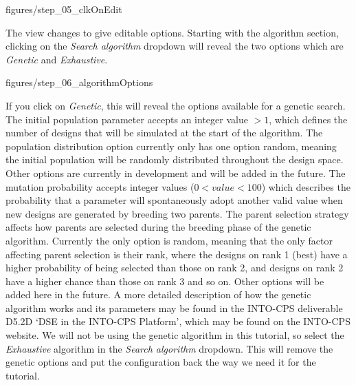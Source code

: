 \documentclass[11pt,a4paper]{../tutorial}
\begin{document}
\begin{instructions}
\begin{center}\begin{annotation}[width=0.7\linewidth,trim=0 0 0 0,clip]{figures/step_05_clkOnEdit}
\end{annotation}\end{center}

\newpage

The view changes to give editable options. Starting with the algorithm section, clicking on the \emph{Search algorithm} dropdown will reveal the two options which are \emph{Genetic} and \emph{Exhaustive}.



\begin{center}\begin{annotation}[width=0.7\linewidth,trim=0 0 0 0,clip]{figures/step_06_algorithmOptions}
    \end{annotation}\end{center}

\newpage

If you click on \emph{Genetic}, this will reveal the options available for a genetic search.  The initial population parameter accepts an integer value $>1$, which defines the number of designs that will be simulated at the start of the algorithm.  The population distribution option currently only has one option random, meaning the initial population will be randomly distributed throughout the design space. Other options are currently in development and will be added in the future. The mutation probability accepts integer values ($0 < value < 100$) which describes the probability that a parameter will spontaneously adopt another valid value when new designs are generated by breeding two parents.  The parent selection strategy affects how parents are selected during the breeding phase of the genetic algorithm.  Currently the only option is random, meaning that the only factor affecting parent selection is their rank, where the designs on rank 1 (best) have a higher probability of being selected than those on rank 2, and designs on rank 2 have a higher chance than those on rank 3 and so on. Other options will be added here in the future.  A more detailed description of how the genetic algorithm works and its parameters may be found in the INTO-CPS deliverable D5.2D `DSE in the INTO-CPS Platform’, which may be found on the INTO-CPS website.
We will not be using the genetic algorithm in this tutorial, so select the \emph{Exhaustive} algorithm in the \emph{Search algorithm} dropdown.  This will remove the genetic options and put the configuration back the way we need it for the tutorial.


\end{instructions}
\end{document}
